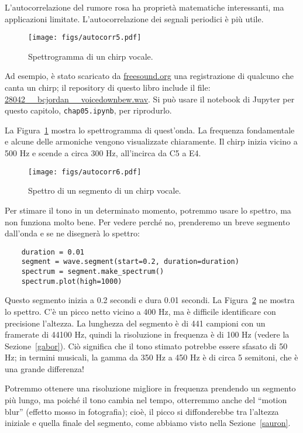 \documentclass[12pt]{book} \usepackage[width=5.5in,height=8.5in, hmarginratio=3:2,vmarginratio=1:1]{geometry}
\begin{document}
L'autocorrelazione del rumore rosa ha proprietà matematiche interessanti, ma applicazioni limitate. L'autocorrelazione dei segnali periodici è più utile.

\begin{figure} 

\centerline{\texttt{[image: figs/autocorr5.pdf]}} \caption{Spettrogramma di un chirp vocale.} \label{fig.autocorr5} \end{figure} 

Ad esempio, è stato scaricato da \url{freesound.org} una registrazione di qualcuno che canta un chirp; il repository di questo libro include il file: \url{28042__bcjordan__voicedownbew.wav}. Si può usare il notebook di Jupyter per questo capitolo, {\tt chap05.ipynb}, per riprodurlo.

La Figura~\ref{fig.autocorr5} mostra lo spettrogramma di quest'onda. La frequenza fondamentale e alcune delle armoniche vengono visualizzate chiaramente. Il chirp inizia vicino a 500 Hz e scende a circa 300 Hz, all'incirca da C5 a E4.

\begin{figure} 

\centerline{\texttt{[image: figs/autocorr6.pdf]}} \caption{Spettro di un segmento di un chirp vocale.} \label{fig.autocorr6} \end{figure} 

Per stimare il tono in un determinato momento, potremmo usare lo spettro, ma non funziona molto bene. Per vedere perché no, prenderemo un breve segmento dall'onda e se ne disegnerà lo spettro:

\begin{verbatim} 
    duration = 0.01
    segment = wave.segment(start=0.2, duration=duration)
    spectrum = segment.make_spectrum()
    spectrum.plot(high=1000)
 \end{verbatim} 

Questo segmento inizia a 0.2 secondi e dura 0.01 secondi. La Figura~\ref{fig.autocorr6} ne mostra lo spettro. C'è un picco netto vicino a 400 Hz, ma è difficile identificare con precisione l'altezza. La lunghezza del segmento è di 441 campioni con un framerate di 44100 Hz, quindi la risoluzione in frequenza è di 100 Hz (vedere la Sezione~\ref{gabor}). Ciò significa che il tono stimato potrebbe essere sfasato di 50 Hz; in termini musicali, la gamma da 350 Hz a 450 Hz è di circa 5 semitoni, che è una grande differenza!

Potremmo ottenere una risoluzione migliore in frequenza prendendo un segmento più lungo, ma poiché il tono cambia nel tempo, otterremmo anche del ``motion blur'' (effetto mosso in fotografia); cioè, il picco si diffonderebbe tra l'altezza iniziale e quella finale del segmento, come abbiamo visto nella Sezione~\ref{sauron}.
\end{document}
